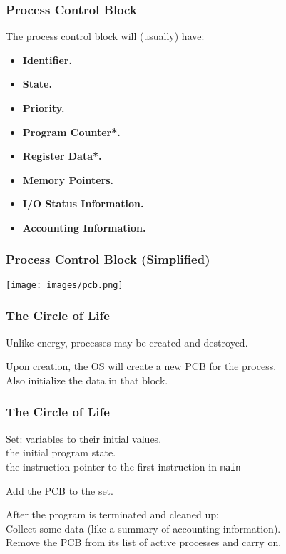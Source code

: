 \begin{frame}
	\frametitle{Process Control Block}

	The process control block will (usually) have:
	\begin{itemize}
		\item \textbf{Identifier.}
		\item \textbf{State.}
		\item \textbf{Priority.}
		\item \textbf{Program Counter*.}
		\item \textbf{Register Data*.}
		\item \textbf{Memory Pointers.}
		\item \textbf{I/O Status Information.}
		\item \textbf{Accounting Information.}
	\end{itemize}

\end{frame}

\begin{frame}
	\frametitle{Process Control Block (Simplified)}

	\begin{center}
		\texttt{[image: images/pcb.png]}
	\end{center}

\end{frame}

\begin{frame}
	\frametitle{The Circle of Life}


	Unlike energy, processes may be created and destroyed.

	Upon creation, the OS will create a new PCB for the process.\\
	\quad Also initialize the data in that block.
	
\end{frame}

\begin{frame}
	\frametitle{The Circle of Life}

	Set: variables to their initial values.\\
	\quad the initial program state.\\
	\quad the instruction pointer to the first instruction in \texttt{main}

	Add the PCB to the set.

	After the program is terminated and cleaned up:\\
	\quad Collect some data (like a summary of accounting information).\\
	\quad Remove the PCB from its list of active processes and carry on.


\end{frame}

